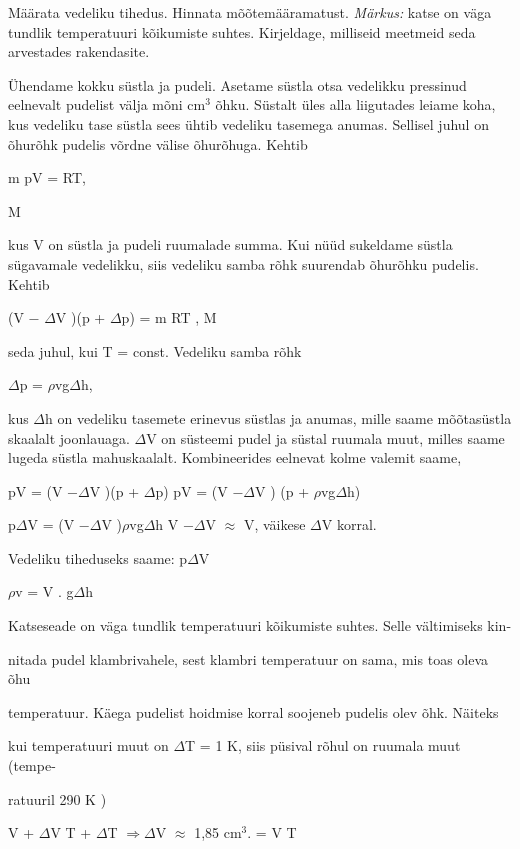 
Määrata vedeliku tihedus. Hinnata mõõtemääramatust.
\textit{Märkus:} katse on väga tundlik temperatuuri kõikumiste suhtes. Kirjeldage, milliseid meetmeid seda arvestades rakendasite.

\hint

\solu
Ühendame kokku süstla ja pudeli. Asetame süstla otsa vedelikku pressinud eelnevalt pudelist välja mõni cm$^3$ õhku. Süstalt üles alla liigutades leiame koha, kus vedeliku tase süstla sees ühtib vedeliku tasemega anumas. Sellisel juhul on õhurõhk pudelis võrdne välise õhurõhuga. Kehtib

m pV = RT,

M

kus V on süstla ja pudeli ruumalade summa. Kui nüüd sukeldame süstla sügavamale vedelikku, siis vedeliku samba rõhk suurendab õhurõhku pudelis. Kehtib

(V $-$ $\Delta$V )(p + $\Delta$p) = m RT , M

seda juhul, kui T = const. Vedeliku samba rõhk

$\Delta$p = $\rho$vg$\Delta$h,

kus $\Delta$h on vedeliku tasemete erinevus süstlas ja anumas, mille saame mõõtasüstla skaalalt joonlauaga. $\Delta$V on süsteemi pudel ja süstal ruumala muut, milles saame lugeda süstla mahuskaalalt. Kombineerides eelnevat kolme valemit saame,

pV = (V $- \Delta$V )(p + $\Delta$p) pV = (V $- \Delta$V ) (p + $\rho$vg$\Delta$h)

p$\Delta$V = (V $- \Delta$V )$\rho$vg$\Delta$h V $- \Delta$V $\approx$ V, väikese $\Delta$V korral.

Vedeliku tiheduseks saame: p$\Delta$V

$\rho$v = V . g$\Delta$h

Katseseade on väga tundlik temperatuuri kõikumiste suhtes. Selle vältimiseks kin-

nitada pudel klambrivahele, sest klambri temperatuur on sama, mis toas oleva õhu

temperatuur. Käega pudelist hoidmise korral soojeneb pudelis olev õhk. Näiteks

kui temperatuuri muut on $\Delta$T = 1 K, siis püsival rõhul on ruumala muut (tempe-

ratuuril 290 K )

V + $\Delta$V T + $\Delta$T $\Rightarrow \Delta$V $\approx$ 1,85 cm$^3$. = V T
\probend
